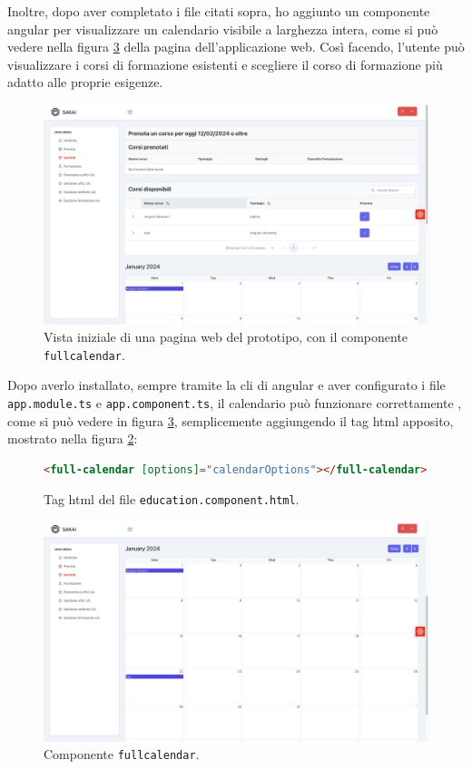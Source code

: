 Inoltre, dopo aver completato i file citati sopra, ho aggiunto un componente \gls{angular} per visualizzare un calendario visibile a larghezza intera, come si può vedere nella figura \ref{fig:fullcalendar} della pagina dell'applicazione web. Così facendo, l'utente può visualizzare i corsi di formazione esistenti e scegliere il corso di formazione più adatto alle proprie esigenze.
\begin{figure}[H]
\centering
\includegraphics[width=1\textwidth]{Images/calendar cut.jpg}
\caption{\label{fig:calendar}Vista iniziale di una pagina web del prototipo, con il componente \texttt{fullcalendar}.}
\end{figure}

Dopo averlo installato, sempre tramite la \acrshort{cli} di \gls{angular} e aver configurato i file \texttt{app.module.ts} e \texttt{app.component.ts}, il calendario può funzionare correttamente \cite{fullcalendar}, come si può vedere in figura \ref{fig:fullcalendar}, semplicemente aggiungendo il tag \acrshort{html} apposito, mostrato nella figura \ref{fig:fullcalendar.html}:
\begin{figure}[H]
\centering
\begin{lstlisting}[language=HTML]
<full-calendar [options]="calendarOptions"></full-calendar>
\end{lstlisting}
\caption{\label{fig:fullcalendar.html}Tag \acrshort{html} del file \texttt{education.component.html}.}
\end{figure}

\begin{figure}[H]
\centering
\includegraphics[width=1\textwidth]{Images/fullcalendar.jpg}
\caption{\label{fig:fullcalendar}Componente \texttt{fullcalendar}.}
\end{figure}

